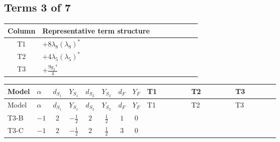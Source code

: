 \documentclass[8pt]{article}
\begin{document}
\begin{landscape}
\subsection*{Terms 3 of 7}
\begin{center}
\begin{tabular}{@{}c >{\raggedright\arraybackslash}p{0.82\linewidth}@{}}
\toprule
Column & Representative term structure \\
\midrule
T1 & \(\displaystyle +8 {\lambda_8} \left({\lambda_8}\right)^{*}\) \\
\midrule
T2 & \(\displaystyle +4 {\lambda_5} \left({\lambda_5}\right)^{*}\) \\
\midrule
T3 & \(\displaystyle +\frac{9 {g_2}^4}{4}\) \\
\midrule
\bottomrule
\end{tabular}
\end{center}
\smallskip
\tiny
\begin{longtable}{@{}llcccccc >{\raggedright\arraybackslash}p{0.21\linewidth} >{\raggedright\arraybackslash}p{0.21\linewidth} >{\raggedright\arraybackslash}p{0.21\linewidth}@{}}
\toprule
Model & $\alpha$ & $d_{S_1}$ & $Y_{S_1}$ & $d_{S_2}$ & $Y_{S_2}$ & $d_F$ & $Y_F$ & T1 & T2 & T3 \\
\midrule
\endfirsthead
\toprule
Model & $\alpha$ & $d_{S_1}$ & $Y_{S_1}$ & $d_{S_2}$ & $Y_{S_2}$ & $d_F$ & $Y_F$ & T1 & T2 & T3 \\
\midrule
\endhead
T3-B & $-1$ & $2$ & $-\frac{1}{2}$ & $2$ & $\frac{1}{2}$ & $1$ & $0$ & \scriptsize\adjustbox{max width=\linewidth}{$\begin{gathered} +8 {\lambda_8} \left({\lambda_8}\right)^{*}\end{gathered}$} & \scriptsize\adjustbox{max width=\linewidth}{$\begin{gathered} +4 {\lambda_5} \left({\lambda_5}\right)^{*}\end{gathered}$} & \scriptsize\adjustbox{max width=\linewidth}{$\begin{gathered} +\frac{9 {g_2}^4}{4}\end{gathered}$} \\
\midrule
T3-C & $-1$ & $2$ & $-\frac{1}{2}$ & $2$ & $\frac{1}{2}$ & $3$ & $0$ & \scriptsize\adjustbox{max width=\linewidth}{$\begin{gathered} +8 {\lambda_8} \left({\lambda_8}\right)^{*}\end{gathered}$} & \scriptsize\adjustbox{max width=\linewidth}{$\begin{gathered} +4 {\lambda_5} \left({\lambda_5}\right)^{*}\end{gathered}$} & \scriptsize\adjustbox{max width=\linewidth}{$\begin{gathered} +\frac{9 {g_2}^4}{4}\end{gathered}$} \\

\end{longtable}
\end{landscape}
\end{document}
